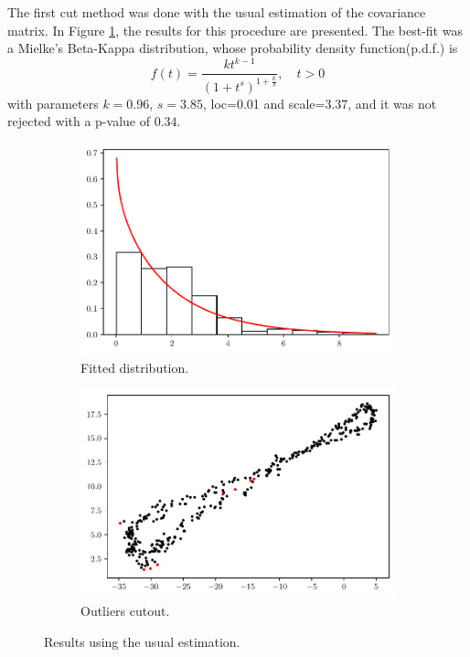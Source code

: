\documentclass[11pt]{article}
\theoremstyle{definition}
\theoremstyle{remark}
\theoremstyle{remark}
\begin{document}
The first cut method was done with the usual estimation of the
covariance matrix. In Figure \ref{fig:nrob_cut_nnoise}, the results
for this procedure are presented. The best-fit was a Mielke's
Beta-Kappa distribution, whose probability density function(p.d.f.) is
\[
f(t)=\dfrac{kt^{k-1}}{(1+t^s)^{1+\frac{k}{s}}},\quad t>0
\]
with parameters $k=0.96$, $s=3.85$, loc=0.01 and scale=3.37, and it
was not rejected with a p-value of $0.34$.

\begin{figure}[H]
  \centering
  \begin{subfigure}[t]{0.475\textwidth}
    \centering
    \includegraphics[scale=0.45]{../figs/non_robust_hist_no-noise.pdf}
    \caption{Fitted distribution.}
  \end{subfigure}
  \begin{subfigure}[t]{0.475\textwidth}
    \centering
    \includegraphics[scale=0.45]{../figs/non_robust_scatter_no-noise.pdf}
    \caption{Outliers cutout.}
    \end{subfigure}
  \caption{Results using the usual estimation.}
  \label{fig:nrob_cut_nnoise}
\end{figure}
\end{document}
